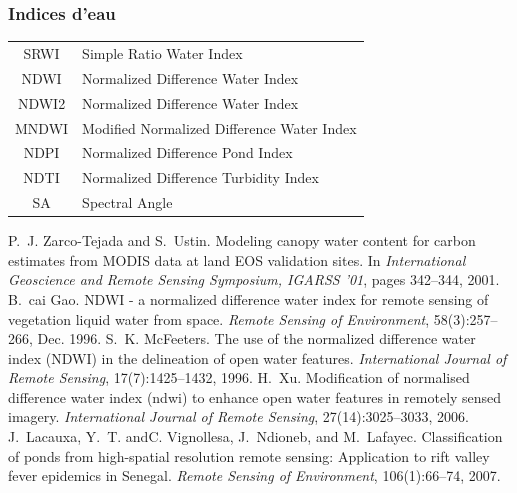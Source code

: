 \documentclass[compress]{beamer}
\begin{document}
\begin{frame}
\frametitle{Indices d'eau}
\footnotesize \centering
\begin{tabular}{|c|l|}
\hline
SRWI & Simple Ratio Water Index \cite{ZarcoTejada2001-SRWI} \\
NDWI & Normalized Difference Water Index  \cite{Gao1996-NDWI} \\
NDWI2 &  Normalized Difference Water Index \cite{McFeeters1996-NDWI2} \\
MNDWI &  Modified Normalized Difference Water Index  \cite{Xu2006-MNDWI} \\
NDPI &  Normalized Difference Pond Index \cite{Lacaux2007-NDTI} \\
NDTI &  Normalized Difference Turbidity Index  \cite{Lacaux2007-NDTI} \\
SA & Spectral Angle \\
\hline
\end{tabular}
\begin{thebibliography}{noidea}
\tiny
{}
P.~J. Zarco-Tejada and S.~Ustin.
 Modeling canopy water content for carbon estimates from {MODIS} data
  at land {EOS} validation sites.
 In {\em International Geoscience and Remote Sensing Symposium, IGARSS
  '01}, pages 342--344, 2001.
B.~cai Gao.
 {NDWI} - a normalized difference water index for remote sensing of
  vegetation liquid water from space.
 {\em Remote Sensing of Environment}, 58(3):257--266,
        Dec. 1996.
S.~K. McFeeters.
 The use of the normalized difference water index ({NDWI}) in the
  delineation of open water features.
 {\em International Journal of Remote Sensing}, 17(7):1425--1432,
  1996.
H.~Xu.
 Modification of normalised difference water index (ndwi) to enhance
  open water features in remotely sensed imagery.
 {\em International Journal of Remote Sensing}, 27(14):3025--3033,
  2006.
J.~Lacauxa, Y.~T. andC. Vignollesa, J.~Ndioneb, and M.~Lafayec.
 Classification of ponds from high-spatial resolution remote sensing:
  Application to rift valley fever epidemics in Senegal.
 {\em Remote Sensing of Environment}, 106(1):66--74, 2007.
\end{thebibliography}
\end{frame}
\end{document}
